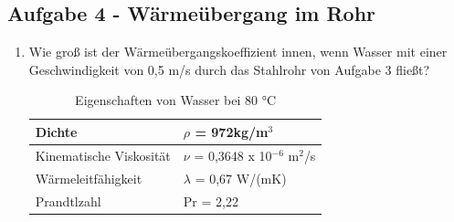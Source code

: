 \documentclass[a4paper,11pt]{article}
\begin{document}
\subsection*{Aufgabe 4 - Wärmeübergang im Rohr}
\begin{enumerate}[label=\alph*)]
\item Wie groß ist der Wärmeübergangskoeffizient innen, wenn Wasser mit einer
Geschwindigkeit von 0,5 m/s durch das Stahlrohr von Aufgabe 3 fließt?

\begin{table}[h]
\centering
\caption{Eigenschaften von Wasser bei 80 °C}
\begin{tabular}{l|l}\rowcolor{miugray!50}
Dichte & $\rho$ = 972kg/m$^3$ \\ \hline
Kinematische Viskosität & $\nu$  = 0,3648 x 10$^{-6}$ m$^{2}$/s \\ \hline
Wärmeleitfähigkeit & $\lambda$ = 0,67 W/(mK) \\ \hline
Prandtlzahl & Pr = 2,22  \\ \hline
\end{tabular}
\end{table}


\end{enumerate}
\end{document}
